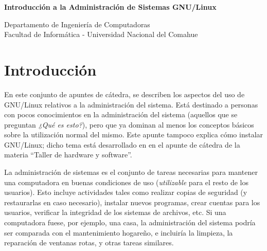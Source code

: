 \documentclass[12pt]{article}
\def\maketitle{

 \makeatletter
 {\color{bl} \centering \huge \sc \textbf{
Introducción a la Administración de Sistemas GNU/Linux \\
 \vspace*{8pt} }\par}
 \makeatother


 \makeatletter
 {\centering \small 
 	Departamento de Ingeniería de Computadoras \\
 	Facultad de Informática - Universidad Nacional del Comahue \\
 	\vspace{20pt} }
 \makeatother

}
\begin{document}
\thispagestyle{empty}
\maketitle
\setlength{\parindent}{0pt}




\section{Introducción}

En este conjunto de apuntes de cátedra, se describen los aspectos del uso 
de GNU/Linux relativos a la administración del
sistema. Está destinado a personas con pocos conocimientos en la
administración del sistema (aquellos que se preguntan \textit{¿Qué es 
esto?}), pero que ya dominan al menos los conceptos básicos sobre la 
utilización normal del mismo. Este apunte tampoco explica cómo instalar 
GNU/Linux; dicho tema está desarrollado en
en el apunte de cátedra de la materia ``Taller de hardware y software''. 

La administración de sistemas es el conjunto de tareas necesarias para
mantener una computadora en buenas condiciones de uso 
(\textit{utilizable} para el resto de los usuarios). Esto incluye 
actividades tales como realizar copias de seguridad (y restaurarlas 
en caso necesario), instalar nuevos programas, crear cuentas para 
los usuarios, verificar la integridad de los sistemas de archivos, etc. 
Si una computadora fuese, por ejemplo, una casa, la administración 
del sistema podría ser comparada con el mantenimiento hogareño, e 
incluiría la limpieza, la reparación de ventanas rotas, y otras
tareas similares.  

\end{document}
